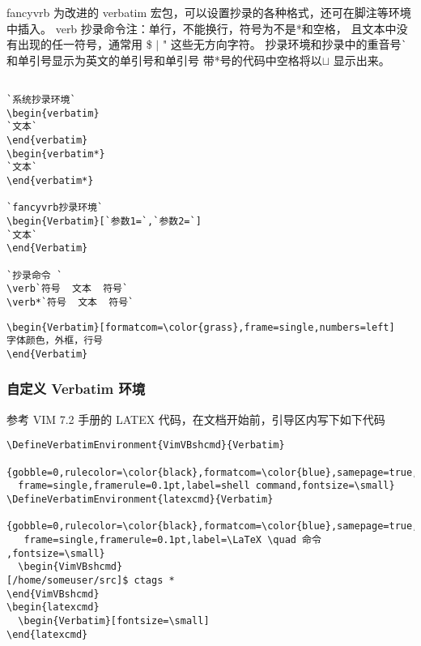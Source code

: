 fancyvrb 为改进的 verbatim 宏包，可以设置抄录的各种格式，还可在脚注等环境中插入。
verb 抄录命令注：单行，不能换行，符号为不是*和空格，
且文本中没有出现的任一符号，通常用 \$ $|$ " 这些无方向字符。
抄录环境和抄录中的重音号\verb|`|和单引号显示为英文的单引号和单引号
带*号的代码中空格将以$\sqcup$ 显示出来。
\begin{lstlisting}[language={[LaTeX]TeX}]

`系统抄录环境`
\begin{verbatim}
`文本`
\end{verbatim}
\begin{verbatim*}
`文本`
\end{verbatim*}

`fancyvrb抄录环境`
\begin{Verbatim}[`参数1=`,`参数2=`]
`文本`
\end{Verbatim}

`抄录命令 `
\verb`符号  文本  符号`
\verb*`符号  文本  符号`
\end{lstlisting}

\begin{verbatim}
\begin{Verbatim}[formatcom=\color{grass},frame=single,numbers=left]
字体颜色，外框，行号
\end{Verbatim}
\end{verbatim}

\subsubsection{自定义 Verbatim 环境}
参考 VIM 7.2 手册的 LATEX 代码，在文档开始前，引导区内写下如下代码
\begin{shaded}
  \begin{Verbatim}[fontsize=\tiny]
\DefineVerbatimEnvironment{VimVBshcmd}{Verbatim}
  {gobble=0,rulecolor=\color{black},formatcom=\color{blue},samepage=true,numbers=none,numbersep=0mm,
  frame=single,framerule=0.1pt,label=shell command,fontsize=\small}
\DefineVerbatimEnvironment{latexcmd}{Verbatim}
  {gobble=0,rulecolor=\color{black},formatcom=\color{blue},samepage=true,numbers=none,numbersep=0mm,
   frame=single,framerule=0.1pt,label=\LaTeX \quad 命令 ,fontsize=\small}
  \begin{VimVBshcmd}
[/home/someuser/src]$ ctags *
\end{VimVBshcmd}
\begin{latexcmd}
  \begin{Verbatim}[fontsize=\small]
\end{latexcmd}

\end{Verbatim}
\end{shaded}

